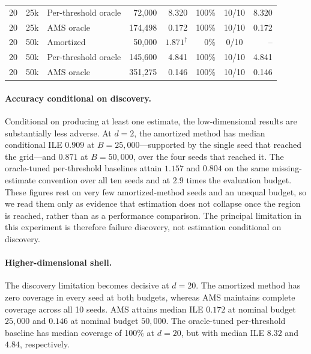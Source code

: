 \documentclass[twoside,11pt]{article}
\begin{document}
\begin{table}[ht!]
\begin{tabular}{@{}cc l r r r c r@{}}
        20 & 25k
           & Per-threshold oracle
           & 72,000
           & 8.320
           & 100\%
           & 10/10
           & 8.320 \\

        20 & 25k
           & AMS oracle
           & 174,498
           & 0.172
           & 100\%
           & 10/10
           & 0.172 \\

        \addlinespace

        20 & 50k
           & Amortized
           & 50,000
           & $1.871^{\dagger}$
           & 0\%
           & 0/10
           & -- \\

        20 & 50k
           & Per-threshold oracle
           & 145,600
           & 4.841
           & 100\%
           & 10/10
           & 4.841 \\

        20 & 50k
           & AMS oracle
           & 351,275
           & 0.146
           & 100\%
           & 10/10
           & 0.146 \\

        \bottomrule
    \end{tabular}
\end{table}

\paragraph{Accuracy conditional on discovery.}
Conditional on producing at least one estimate, the low-dimensional results are substantially less adverse. At $d=2$, the amortized method has median conditional ILE $0.909$ at $B=25{,}000$---supported by the single seed that reached the grid---and $0.871$ at $B=50{,}000$, over the four seeds that reached it. The oracle-tuned per-threshold baselines attain $1.157$ and $0.804$ on the same missing-estimate convention over all ten seeds and at $2.9$ times the evaluation budget. These figures rest on very few amortized-method seeds and an unequal budget, so we read them only as evidence that estimation does not collapse once the region is reached, rather than as a performance comparison. The principal limitation in this experiment is therefore failure discovery, not estimation conditional on discovery.

\paragraph{Higher-dimensional shell.}
The discovery limitation becomes decisive at $d=20$. The amortized method has zero coverage in every seed at both budgets, whereas AMS maintains complete coverage across all 10 seeds. AMS attains median ILE $0.172$ at nominal budget $25{,}000$ and $0.146$ at nominal budget $50{,}000$. The oracle-tuned per-threshold baseline has median coverage of 100\% at $d=20$, but with median ILE $8.32$ and $4.84$, respectively.
\end{document}
